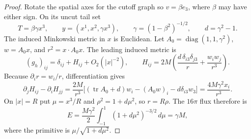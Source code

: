 \begin{proof}
Rotate the spatial axes for the cutoff graph so $v=\beta e_3$,
where $\beta$ may have either sign.  On its uncut tail set
\[
 T=\beta\gamma x^3,\qquad
 y=(x^1,x^2,\gamma x^3),\qquad
 \gamma=(1-\beta^2)^{-1/2},\qquad d=\gamma^2-1.
\]
The induced Minkowski metric in $x$ is Euclidean.  Let
$A_0=\operatorname{diag}(1,1,\gamma^2)$,
$w=A_0x$, and $r^2=x\cdot A_0x$.  The leading induced metric is
\begin{equation}
\label{ri:boost-metric}
 (g_h)_{ij}=\delta_{ij}+H_{ij}+O_2(|x|^{-2}),\qquad
 H_{ij}=2M\left(\frac{d\,\delta_{i3}\delta_{j3}}r
                     +\frac{w_iw_j}{r^3}\right).
\end{equation}
Because $\partial_i r=w_i/r$, differentiation gives
\[
 \partial_jH_{ij}-\partial_iH_{jj}
 =\frac{2M}{r^3}
  \bigl[(\operatorname{tr}A_0+d)w_i-(A_0w)_i
                     -d\delta_{i3}w_3\bigr]
 =\frac{4M\gamma^2x_i}{r^3}.
\]
On $|x|=R$ put $\mu=x^3/R$ and
$\rho^2=1+d\mu^2$, so $r=R\rho$.  The $16\pi$ flux therefore is
\begin{equation}
\label{ri:boost-energy}
 E=\frac{M\gamma^2}{2}
        \int_{-1}^1(1+d\mu^2)^{-3/2}\,d\mu
   =\gamma M,
\end{equation}
where the primitive is $\mu/\sqrt{1+d\mu^2}$.


\end{proof}
